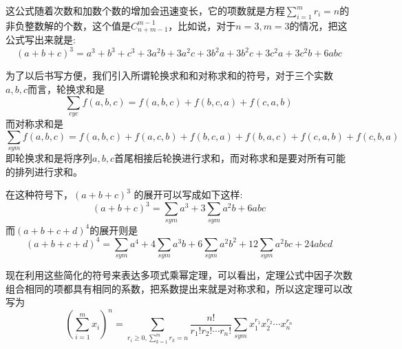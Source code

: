 这公式随着次数和加数个数的增加会迅速变长，它的项数就是方程$\sum_{i=1}^mr_i=n$的非负整数解的个数，这个值是$C_{n+m-1}^{m-1}$，比如说，对于$n=3,m=3$的情况，把这公式写出来就是:
\begin{equation*}
  (a+b+c)^3 = a^3+b^3+c^3+3a^2b+3a^2c+3b^2a+3b^2c+3c^2a+3c^2b+6abc
\end{equation*}

为了以后书写方便，我们引入所谓轮换求和和对称求和的符号，对于三个实数$a,b,c$而言，轮换求和是
\begin{equation*}
  \sum_{cyc} f(a,b,c) = f(a,b,c) + f(b, c, a) + f(c, a ,b)
\end{equation*}
而对称求和是
\begin{equation*}
  \sum_{sym} f(a,b,c) = f(a, b, c) + f(a, c, b) + f(b, c, a) + f(b, a, c) + f(c, a, b) + f(c, b, a)
\end{equation*}
即轮换求和是将序列$a,b,c$首尾相接后轮换进行求和，而对称求和是要对所有可能的排列进行求和。

在这种符号下，$(a+b+c)^3$ 的展开可以写成如下这样:
\begin{equation*}
  (a+b+c)^3 = \sum_{sym}a^3+3\sum_{sym}a^2b+6abc
\end{equation*}
而$(a+b+c+d)^4$的展开则是
\begin{equation*}
  (a+b+c+d)^4 = \sum_{sym} a^4 + 4 \sum_{sym}a^3b + 6\sum_{sym}a^2b^2+12\sum_{sym}a^2bc+24abcd
\end{equation*}

现在利用这些简化的符号来表达多项式乘幂定理，可以看出，定理公式中因子次数组合相同的项都具有相同的系数，把系数提出来就是对称求和，所以这定理可以改写为
\begin{equation*}
  \left( \sum_{i=1}^m x_i \right)^n = \sum_{r_i \geqslant 0, \sum_{k=1}^m r_k=n} \frac{n!}{r_1!r_2!\cdots r_n!} \sum_{sym} x_1^{r_1}x_2^{r_2}\cdots x_n^{r_n}
\end{equation*}

